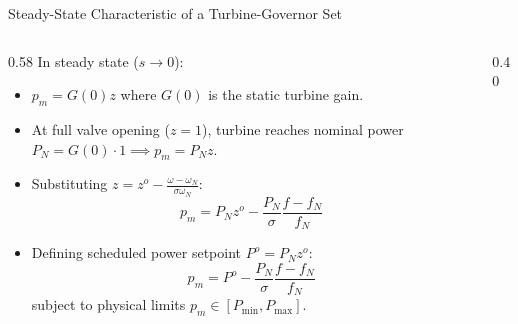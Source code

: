 \begin{frame}{Steady-State Characteristic of a Turbine-Governor Set}
\begin{columns}[T]
\begin{column}{0.58\textwidth}
    \footnotesize
    In steady state ($s \to 0$):
    \begin{itemize}\setlength{\itemsep}{2pt}
        \item $p_m = G(0) z$ where $G(0)$ is the static turbine gain.
        \item At full valve opening ($z = 1$), turbine reaches nominal power $P_N = G(0) \cdot 1 \implies p_m = P_N z$.
        \item Substituting $z = z^o - \frac{\omega - \omega_N}{\sigma \omega_N}$:
        \begin{equation*}
            p_m = P_N z^o - \frac{P_N}{\sigma} \frac{f - f_N}{f_N}
        \end{equation*}
        \item Defining scheduled power setpoint $P^o = P_N z^o$:
        \begin{equation*}
            \boxed{p_m = P^o - \frac{P_N}{\sigma} \frac{f - f_N}{f_N}}
        \end{equation*}
        subject to physical limits $p_m \in [P_{\min}, P_{\max}]$.
    \end{itemize}
\end{column}
\begin{column}{0.40\textwidth}
    \centering
\end{column}
\end{columns}
\end{frame}
